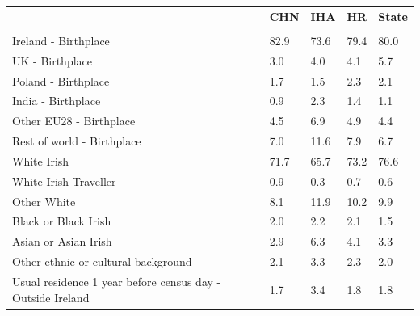 \documentclass{article}
\begin{document}
\pagebreak
\begin{table}[h]	
\centering
		\begin{tabular}{KTTTT}
  \hline
& \textbf{CHN} & \textbf{IHA} & \textbf{HR}& \textbf{State}\\ 
  \hline
    \\ 
    \hline
Ireland - Birthplace & 82.9& 73.6& 79.4& 80.0\\
UK - Birthplace & 3.0& 4.0& 4.1& 5.7\\
Poland - Birthplace & 1.7& 1.5& 2.3& 2.1\\
India - Birthplace & 0.9& 2.3& 1.4& 1.1\\
Other EU28 - Birthplace & 4.5& 6.9& 4.9& 4.4\\
Rest of world - Birthplace &  7.0& 11.6&  7.9&  6.7\\
    \hline
White Irish & 71.7& 65.7& 73.2& 76.6\\
White Irish Traveller & 0.9& 0.3& 0.7& 0.6\\
Other White &  8.1& 11.9& 10.2&  9.9\\
Black or Black Irish & 2.0& 2.2& 2.1& 1.5\\
Asian or Asian Irish & 2.9& 6.3& 4.1& 3.3\\
Other ethnic or cultural background & 2.1& 3.3& 2.3& 2.0\\
    \hline
Usual residence 1 year before census day - Outside Ireland & 1.7& 3.4& 1.8& 1.8\\


\end{tabular}
\end{table}
\end{document}

